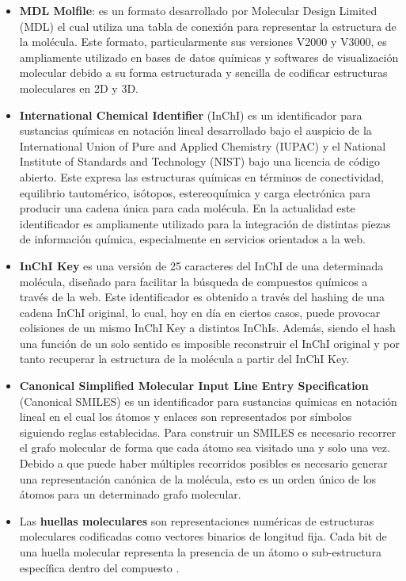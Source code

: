 \begin{itemize}
  \item \textbf{MDL Molfile}: es un formato desarrollado por Molecular Design Limited (MDL) \cite{dalby1992description} el cual utiliza una tabla de conexión para representar la estructura de la molécula. Este formato, particularmente sus versiones V2000 y V3000, es ampliamente utilizado en bases de datos químicas y softwares de visualización molecular debido a su forma estructurada y sencilla de codificar estructuras moleculares en 2D y 3D.
  \item \textbf{International Chemical Identifier} (InChI) \cite{heller2015inchi} es un identificador para sustancias químicas en notación lineal desarrollado bajo el auspicio de la International Union of Pure and Applied Chemistry (IUPAC) y el National Institute of Standards and Technology (NIST) bajo una licencia de código abierto. Este expresa las estructuras químicas en términos de conectividad, equilibrio tautomérico, isótopos, estereoquímica y carga electrónica para producir una cadena única para cada molécula. En la actualidad este identificador es ampliamente utilizado para la integración de distintas piezas de información química, especialmente en servicios orientados a la web.
  \item \textbf{InChI Key} \cite{heller2015inchi} es una versión de 25 caracteres del InChI de una determinada molécula, diseñado para facilitar la búsqueda de compuestos químicos a través de la web. Este identificador es obtenido a través del hashing de una cadena InChI original, lo cual, hoy en día en ciertos casos, puede provocar colisiones de un mismo InChI Key a distintos InChIs. Además, siendo el hash una función de un solo sentido es imposible reconstruir el InChI original y por tanto recuperar la estructura de la molécula a partir del InChI Key.
  \item \textbf{Canonical Simplified Molecular Input Line Entry Specification} (Canonical SMILES) \cite{weininger1988smiles}  es un identificador para sustancias químicas en notación lineal en el cual los átomos y enlaces son representados por símbolos siguiendo reglas establecidas. Para construir un SMILES es necesario recorrer el grafo molecular de forma que cada átomo sea visitado una y solo una vez. Debido a que puede haber múltiples recorridos posibles es necesario generar una representación canónica de la molécula, esto es un orden único de los átomos para un determinado grafo molecular.
  \item Las \textbf{huellas moleculares} son representaciones numéricas de estructuras moleculares codificadas como vectores binarios de longitud fija. Cada bit de una huella molecular representa la presencia de un átomo o sub-estructura específica dentro del compuesto \cite{cereto2015molecular}. 

\end{itemize}
